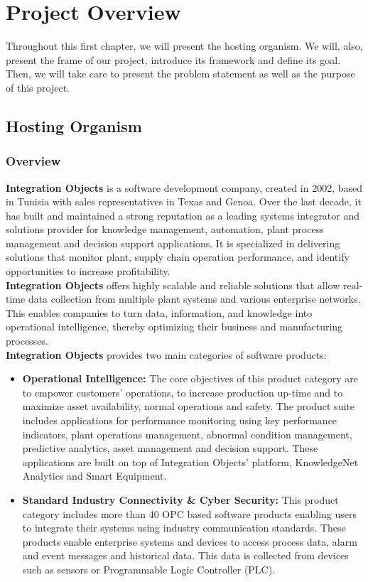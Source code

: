 \chapter{Project Overview} 
\label{Chapter1} 
Throughout this first chapter, we will present the hosting organism. We will, also, present the frame of our project, introduce its framework and define its goal. Then, we will take care to present the problem statement as well as the purpose of this project.
\section{Hosting Organism}
\subsection{Overview}
\textbf{Integration Objects} is a software development company, created in 2002, based in Tunisia with sales representatives in Texas and Genoa. Over the last decade, it has built and maintained a strong reputation as a leading systems integrator and solutions provider for knowledge management, automation, plant process management and decision support applications. It is specialized in delivering solutions that monitor plant, supply chain operation performance, and identify opportunities to increase profitability.\\

\textbf{Integration Objects} offers highly scalable and reliable solutions that allow real-time data collection from multiple plant systems and various enterprise networks. This enables companies to turn data, information, and knowledge into operational intelligence, thereby optimizing their business and manufacturing processes.\\

\textbf{Integration Objects} provides two main categories of software products:
\begin{itemize}
\item \textbf{Operational Intelligence:} The core objectives of this product category are to empower customers' operations, to increase production up-time and to maximize asset availability, normal operations and safety. The product suite includes applications for performance
monitoring using key performance indicators, plant operations management, abnormal condition management, predictive analytics, asset management and decision support. These applications are built on top of Integration Objects' platform, KnowledgeNet Analytics
and Smart Equipment.
\item \textbf{Standard Industry Connectivity \& Cyber Security:} This product category includes more than 40 OPC based software products enabling users to integrate their systems using industry communication standards. These products enable enterprise systems and devices to access process data, alarm and event messages and historical data. This data is collected from devices such as sensors or Programmable Logic Controller (PLC).\\
\end{itemize}

